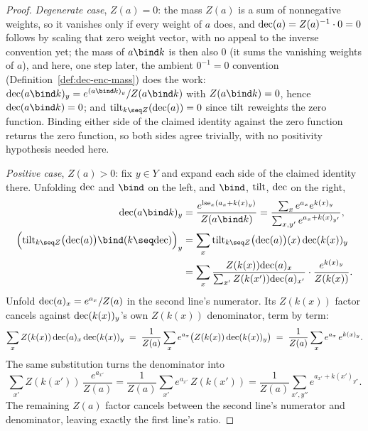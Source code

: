 \begin{proof}
\leanok
\emph{Degenerate case}, $Z(a) = 0$: the mass $Z(a)$ is a sum of
nonnegative weights, so it vanishes only if every weight of $a$ does,
and $\mathrm{dec}(a) = Z(a)^{-1}\cdot 0 = 0$ follows by scaling that zero
weight vector, with no appeal to the inverse convention yet; the mass
of $a \bind k$ is then also $0$ (it sums the
vanishing weights of $a$), and here, one step later, the ambient
$0^{-1}=0$ convention (Definition~\ref{def:dec-enc-mass}) does the
work: $\dec(a \bind k)_y = e^{(a \bind k)_y}/Z(a \bind k)$ with
$Z(a \bind k) = 0$, hence $\dec(a \bind k) = 0$; and
$\tilt_{k \seq Z}(\dec(a)) = 0$ since $\mathrm{tilt}$
reweights the zero function. Binding either side of the claimed
identity against the zero function returns the zero function, so both
sides agree trivially, with no positivity hypothesis needed here.

\emph{Positive case}, $Z(a) > 0$: fix $y \in Y$ and expand each side of
the claimed identity there. Unfolding $\mathrm{dec}$ and $\bind$ on the left,
and $\bind$, $\mathrm{tilt}$, $\mathrm{dec}$
on the right,
\begin{align*}
  \dec(a \bind k)_y
    &= \frac{e^{\lse_x(a_x+k(x)_y)}}{Z(a \bind k)}
     = \frac{\sum_x e^{a_x}e^{k(x)_y}}{\sum_{x,y'}e^{a_x+k(x)_{y'}}}, \\
  \Bigl(\tilt_{k\seq Z}\bigl(\dec(a)\bigr) \bind (k \seq \dec)\Bigr)_y
    &= \sum_x \tilt_{k\seq Z}\bigl(\dec(a)\bigr)(x)\,\dec(k(x))_y \\
    &= \sum_x \frac{Z(k(x))\dec(a)_x}{\sum_{x'} Z(k(x'))\dec(a)_{x'}}
       \cdot \frac{e^{k(x)_y}}{Z(k(x))}.
\end{align*}
Unfold $\mathrm{dec}(a)_x = e^{a_x}/Z(a)$ in the second line's numerator.
Its $Z(k(x))$ factor cancels against $\mathrm{dec}(k(x))_y$'s own $Z(k(x))$
denominator, term by term:
\[
  \sum_x Z(k(x))\,\mathrm{dec}(a)_x\,\mathrm{dec}(k(x))_y
    \;=\; \frac{1}{Z(a)}\sum_x e^{a_x}\bigl(Z(k(x))\,\mathrm{dec}(k(x))_y\bigr)
    \;=\; \frac{1}{Z(a)}\sum_x e^{a_x}\,e^{k(x)_y}.
\]
The same substitution turns the denominator into
\[
  \sum_{x'} Z(k(x'))\,\frac{e^{a_{x'}}}{Z(a)}
    = \frac{1}{Z(a)}\sum_{x'} e^{a_{x'}}\,Z(k(x'))
    = \frac{1}{Z(a)}\sum_{x',y''} e^{a_{x'}+k(x')_{y''}}.
\]
The remaining $Z(a)$ factor cancels between the second line's
numerator and denominator, leaving exactly the first line's ratio.
\end{proof}

